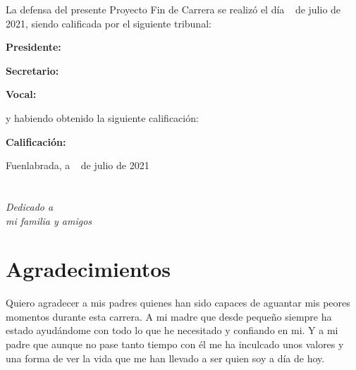 \documentclass[a4paper, 12pt]{book}
\begin{document}
\vspace{1cm}
La defensa del presente Proyecto Fin de Carrera se realizó el día \qquad$\;\,$ de julio de 2021, siendo calificada por el siguiente tribunal:


\vspace{0.5cm}
\textbf{Presidente:}

\vspace{1.2cm}
\textbf{Secretario:}

\vspace{1.2cm}
\textbf{Vocal:}


\vspace{1.2cm}
y habiendo obtenido la siguiente calificación:

\vspace{1cm}
\textbf{Calificación:}


\vspace{1cm}
\begin{flushright}
Fuenlabrada, a \qquad$\;\,$ de julio de 2021
\end{flushright}


\chapter*{}
\begin{flushright}
\textit{Dedicado a \\
mi familia y amigos}
\end{flushright}


\chapter*{Agradecimientos}

Quiero agradecer a mis padres quienes han sido capaces de aguantar mis peores momentos durante esta carrera. A mi madre que desde pequeño siempre ha estado ayudándome con todo lo que he necesitado y confiando en mi. Y a mi padre que aunque no pase tanto tiempo con él me ha inculcado unos valores y una forma de ver la vida que me han llevado a ser quien soy a día de hoy.
\end{document}
